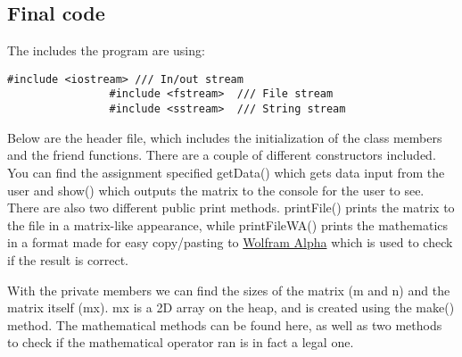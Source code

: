 \documentclass{article}
\begin{document}
		\subsection{Final code}
			
			The includes the program are using:
			\begin{lstlisting}[style=cpp]
				#include <iostream> /// In/out stream
				#include <fstream>  /// File stream
				#include <sstream>  /// String stream
			\end{lstlisting}

			
			Below are the header file, which includes the initialization of the class members and the friend functions. There are a couple of different constructors included.
			You can find the assignment specified getData() which gets data input from the user and show() which outputs the matrix to the console for the user to see.
			There are also two different public print methods. printFile() prints the matrix to the file in a matrix-like appearance, while printFileWA() prints the mathematics in a format made for easy copy/pasting to			\href{https://www.wolframalpha.com/}{Wolfram Alpha}
			which is used to check if the result is correct.
			
			With the private members we can find the sizes of the matrix (m and n) and the matrix itself (mx). mx is a 2D array on the heap, and is created using the make() method.
			The mathematical methods can be found here, as well as two methods to check if the mathematical operator ran is in fact a legal one.
			
\end{document}
